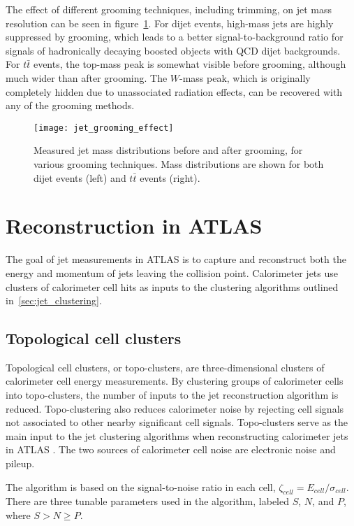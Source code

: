 The effect of different grooming techniques, including trimming, on jet mass resolution can be seen in figure~\ref{fig:jet_grooming_effect}.
For dijet events, high-mass jets are highly suppressed by grooming, which leads to a better signal-to-background ratio
for signals of hadronically decaying boosted objects with QCD dijet backgrounds.
For $t\bar{t}$ events, the top-mass peak is somewhat visible before grooming, although much wider than after grooming.
The $W$-mass peak, which is originally completely hidden due to unassociated radiation effects,
can be recovered with any of the grooming methods.

\begin{figure}[h!]
    \centering
\texttt{[image: jet\_grooming\_effect]}
\caption{Measured jet mass distributions before and after grooming, for various grooming techniques.
Mass distributions are shown for both dijet events (left) and $t\bar{t}$ events (right).}
\label{fig:jet_grooming_effect}
\end{figure}

\section{Reconstruction in ATLAS}\label{sec:jet_reconstruction}
The goal of jet measurements in ATLAS is to capture and reconstruct both the energy and momentum of jets leaving the
collision point.
Calorimeter jets use clusters of calorimeter cell hits as inputs to the clustering algorithms outlined
in~\ref{sec:jet_clustering}.

\subsection{Topological cell clusters}\label{subsec:jet_topo_clusters}
Topological cell clusters, or topo-clusters, are three-dimensional clusters of calorimeter cell energy measurements.
By clustering groups of calorimeter cells into topo-clusters, the number of inputs to the jet reconstruction algorithm
is reduced.
Topo-clustering also reduces calorimeter noise by rejecting cell signals not associated to other nearby significant
cell signals.\cite{jet-topo-cluster}
Topo-clusters serve as the main input to the jet clustering algorithms when reconstructing calorimeter jets in ATLAS .
The two sources of calorimeter cell noise are electronic noise and pileup.

The algorithm is based on the signal-to-noise ratio in each cell, $\zeta_{cell} = E_{cell}/\sigma_{cell}$.
There are three tunable parameters used in the algorithm, labeled $S$, $N$, and $P$, where $S > N \geq P$.

